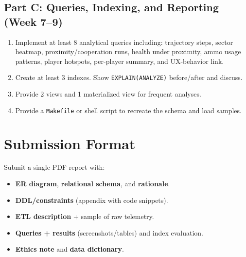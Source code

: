 \documentclass[11pt]{article}
\begin{document}
\subsection*{Part C: Queries, Indexing, and Reporting (Week 7--9)}
\begin{enumerate}[leftmargin=*]
  \item Implement at least 8 analytical queries including: trajectory steps, sector heatmap,
        proximity/cooperation runs, health under proximity, ammo usage patterns, player hotspots,
        per-player summary, and UX-behavior link.
  \item Create at least 3 indexes. Show \texttt{EXPLAIN(ANALYZE)} before/after and discuss.
  \item Provide 2 views and 1 materialized view for frequent analyses.
  \item Provide a \texttt{Makefile} or shell script to recreate the schema and load samples.
\end{enumerate}

\section{Submission Format}

Submit a single PDF report with:
\begin{itemize}[leftmargin=*]
  \item \textbf{ER diagram}, \textbf{relational schema}, and \textbf{rationale}.
  \item \textbf{DDL/constraints} (appendix with code snippets).
  \item \textbf{ETL description} + sample of raw telemetry.
  \item \textbf{Queries + results} (screenshots/tables) and index evaluation.
  \item \textbf{Ethics note} and \textbf{data dictionary}.
\end{itemize}
\end{document}

